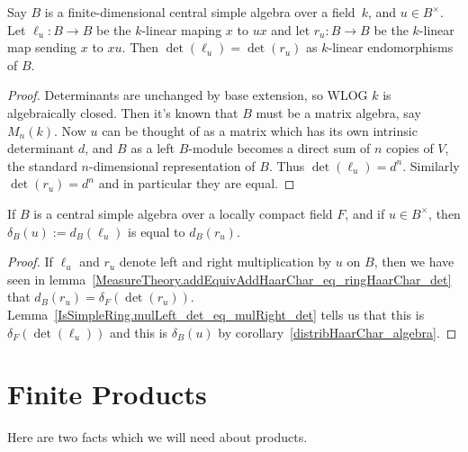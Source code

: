 \begin{lemma}
  \label{IsSimpleRing.mulLeft_det_eq_mulRight_det}
  \leanok
  Say $B$ is a finite-dimensional central simple algebra over a field~$k$,
  and $u\in B^\times$. Let $\ell_u:B\to B$ be the $k$-linear maping $x$ to $ux$ and
  let $r_u:B\to B$ be the $k$-linear map sending $x$ to $xu$. Then
  $\det(\ell_u)=\det(r_u)$ as $k$-linear endomorphisms of $B$.
\end{lemma}
\begin{proof}
  Determinants are unchanged by base extension, so WLOG $k$ is algebraically closed.
  Then it's known that $B$ must be a matrix algebra, say $M_n(k)$. Now $u$ can be thought
  of as a matrix which has its own intrinsic determinant $d$, and $B$ as a left $B$-module
  becomes a direct sum of $n$ copies of $V$, the standard $n$-dimensional representation of $B$.
  Thus $\det(\ell_u)=d^n$. Similarly $\det(r_u)=d^n$ and in particular they are equal.
\end{proof}

\begin{corollary}
  \label{IsSimpleRing.ringHaarChar_eq_addEquivAddHaarChar_mulRight}
  \leanok
  If $B$ is a central simple algebra over a locally compact field $F$, and if $u\in B^\times$,
  then $\delta_B(u):=d_B(\ell_u)$ is equal to $d_B(r_u)$.
\end{corollary}
\begin{proof}
  If $\ell_u$ and $r_u$ denote left and right multiplication by $u$ on $B$, then we have
  seen in lemma~\ref{MeasureTheory.addEquivAddHaarChar_eq_ringHaarChar_det} that $d_B(r_u)=\delta_F(\det(r_u))$.
  Lemma~\ref{IsSimpleRing.mulLeft_det_eq_mulRight_det} tells
  us that this is $\delta_F(\det(\ell_u))$ and this is $\delta_B(u)$ by
  corollary~\ref{distribHaarChar_algebra}.
\end{proof}

\section{Finite Products}

Here are two facts which we will need about products.

